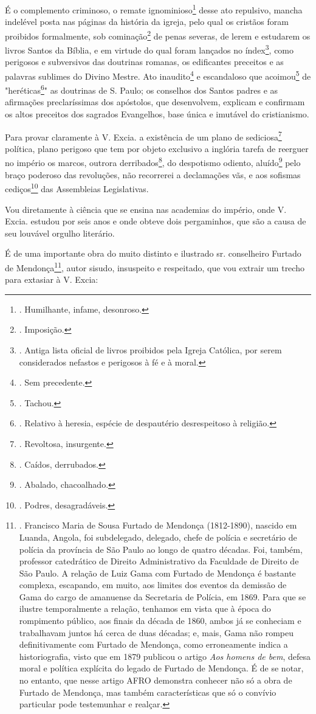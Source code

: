 É o complemento criminoso, o remate ignominioso\footnote{. Humilhante,
  infame, desonroso.} desse ato repulsivo, mancha indelével posta nas
páginas da história da igreja, pelo qual os cristãos foram proibidos
formalmente, sob cominação\footnote{. Imposição.} de penas severas, de
lerem e estudarem os livros Santos da Bíblia, e em virtude do qual foram
lançados no índex\footnote{. Antiga lista oficial de livros proibidos
  pela Igreja Católica, por serem considerados nefastos e perigosos à fé
  e à moral.}, como perigosos e subversivos das doutrinas romanas, os
edificantes preceitos e as palavras sublimes do Divino Mestre. Ato
inaudito\footnote{. Sem precedente.} e escandaloso que
acoimou\footnote{. Tachou.} de "heréticas\footnote{. Relativo à heresia,
  espécie de despautério desrespeitoso à religião.}" as doutrinas de S.
Paulo; os conselhos dos Santos padres e as afirmações preclaríssimas dos
apóstolos, que desenvolvem, explicam e confirmam os altos preceitos dos
sagrados Evangelhos, base única e imutável do cristianismo.

Para provar claramente à V. Excia. a existência de um plano de
sediciosa\footnote{. Revoltosa, insurgente.} política, plano perigoso
que tem por objeto exclusivo a inglória tarefa de reerguer no império os
marcos, outrora derribados\footnote{. Caídos, derrubados.}, do
despotismo odiento, aluído\footnote{. Abalado, chacoalhado.} pelo braço
poderoso das revoluções, não recorrerei a declamações vãs, e aos
sofismas cediços\footnote{. Podres, desagradáveis.} das Assembleias
Legislativas.

Vou diretamente à ciência que se ensina nas academias do império, onde
V. Excia. estudou por seis anos e onde obteve dois pergaminhos, que são
a causa de seu louvável orgulho literário.

É de uma importante obra do muito distinto e ilustrado sr. conselheiro
Furtado de Mendonça\footnote{. Francisco Maria de Sousa Furtado de
  Mendonça (1812-1890), nascido em Luanda, Angola, foi subdelegado,
  delegado, chefe de polícia e secretário de polícia da província de São
  Paulo ao longo de quatro décadas. Foi, também, professor catedrático
  de Direito Administrativo da Faculdade de Direito de São Paulo. A
  relação de Luiz Gama com Furtado de Mendonça é bastante complexa,
  escapando, em muito, aos limites dos eventos da demissão de Gama do
  cargo de amanuense da Secretaria de Polícia, em 1869. Para que se
  ilustre temporalmente a relação, tenhamos em vista que à época do
  rompimento público, aos finais da década de 1860, ambos já se
  conheciam e trabalhavam juntos há cerca de duas décadas; e, mais, Gama
  não rompeu definitivamente com Furtado de Mendonça, como erroneamente
  indica a historiografia, visto que em 1879 publicou o artigo \emph{Aos
  homens de bem}, defesa moral e política explícita do legado de Furtado
  de Mendonça. É de se notar, no entanto, que nesse artigo AFRO
  demonstra conhecer não só a obra de Furtado de Mendonça, mas também
  características que só o convívio particular pode testemunhar e
  realçar.}, autor sisudo, insuspeito e respeitado, que vou extrair um
trecho para extasiar à V. Excia:

